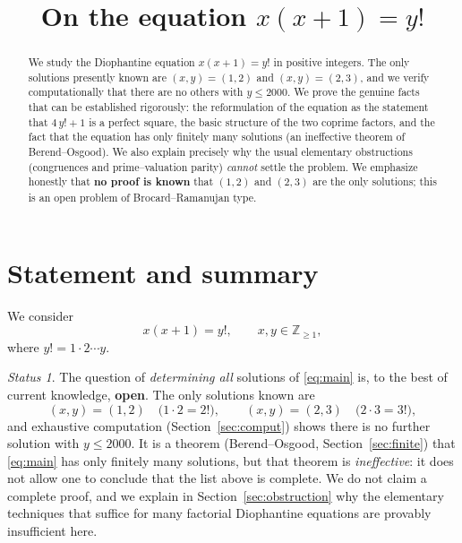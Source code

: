 \documentclass{amsart}
\theoremstyle{plain}
\theoremstyle{remark}
\newtheorem*{statusnote}{Status}
\begin{document}
\title{On the equation $x(x+1)=y!$}
\maketitle

\begin{abstract}
We study the Diophantine equation $x(x+1)=y!$ in positive integers.
The only solutions presently known are $(x,y)=(1,2)$ and $(x,y)=(2,3)$,
and we verify computationally that there are no others with $y\le 2000$.
We prove the genuine facts that can be established rigorously: the
reformulation of the equation as the statement that $4\,y!+1$ is a perfect
square, the basic structure of the two coprime factors, and the fact that
the equation has only finitely many solutions (an ineffective theorem of
Berend--Osgood).  We also explain precisely why the usual elementary
obstructions (congruences and prime--valuation parity) \emph{cannot} settle
the problem.  We emphasize honestly that \textbf{no proof is known} that
$(1,2)$ and $(2,3)$ are the only solutions; this is an open problem of
Brocard--Ramanujan type.
\end{abstract}

\section{Statement and summary}

We consider
\begin{equation}\label{eq:main}
   x(x+1)=y!,\qquad x,y\in\mathbb{Z}_{\ge 1},
\end{equation}
where $y!=1\cdot 2\cdots y$.

\begin{statusnote}
The question of \emph{determining all} solutions of \eqref{eq:main} is, to
the best of current knowledge, \textbf{open}.  The only solutions known are
\[
   (x,y)=(1,2)\quad\bigl(1\cdot 2=2!\bigr),\qquad
   (x,y)=(2,3)\quad\bigl(2\cdot 3=3!\bigr),
\]
and exhaustive computation (Section~\ref{sec:comput}) shows there is no
further solution with $y\le 2000$.  It is a theorem (Berend--Osgood,
Section~\ref{sec:finite}) that \eqref{eq:main} has only finitely many
solutions, but that theorem is \emph{ineffective}: it does not allow one to
conclude that the list above is complete.  We do not claim a complete
proof, and we explain in Section~\ref{sec:obstruction} why the elementary
techniques that suffice for many factorial Diophantine equations are
provably insufficient here.
\end{statusnote}
\end{document}
